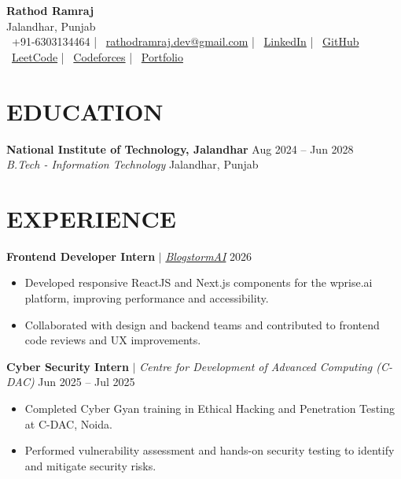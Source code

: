 \documentclass[a4paper,10pt]{article}
\begin{document}
\begin{center}
    {\fontsize{27}{31}\selectfont\textbf{Rathod Ramraj}}\\[3pt]
    Jalandhar, Punjab\\[4pt]
    \small
    \faPhone\ +91-6303134464 \quad | \quad
    \faEnvelope\ \href{mailto:rathodramraj.dev@gmail.com}{rathodramraj.dev@gmail.com} \quad | \quad
    \faLinkedin\ \href{https://www.linkedin.com/in/rathod-ramraj-a50794323}{LinkedIn} \quad | \quad
    \faGithub\ \href{https://github.com/rathod-ramraj}{GitHub}\\[3pt]
    \faCode\ \href{https://leetcode.com/u/Rathod_Ramraj/}{LeetCode} \quad | \quad
    \faCode\ \href{https://codeforces.com/profile/rathodram}{Codeforces} \quad | \quad
    \faGlobe\ \href{https://rathodram.pages.dev}{Portfolio}
\end{center}

\section*{EDUCATION}

\textbf{National Institute of Technology, Jalandhar} \hfill Aug 2024 -- Jun 2028\\
\textit{B.Tech - Information Technology} \hfill Jalandhar, Punjab

\section*{EXPERIENCE}

\textbf{Frontend Developer Intern} $|$ \textit{\href{https://github.com/BlogstormAI}{BlogstormAI}} \hfill 2026
\begin{itemize}
    \item Developed responsive ReactJS and Next.js components for the wprise.ai platform, improving performance and accessibility.
    \item Collaborated with design and backend teams and contributed to frontend code reviews and UX improvements.
\end{itemize}

\textbf{Cyber Security Intern} $|$ \textit{Centre for Development of Advanced Computing (C-DAC)} \hfill Jun 2025 -- Jul 2025
\begin{itemize}
    \item Completed Cyber Gyan training in Ethical Hacking and Penetration Testing at C-DAC, Noida.
    \item Performed vulnerability assessment and hands-on security testing to identify and mitigate security risks.
\end{itemize}
\end{document}
